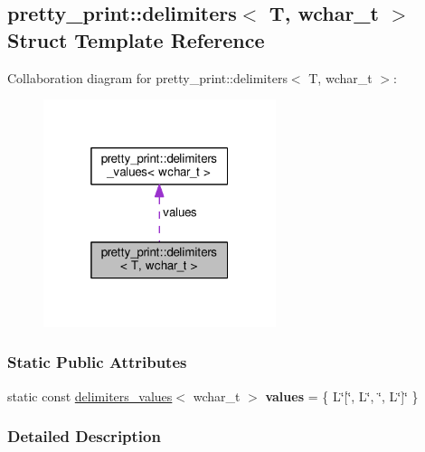 \hypertarget{structpretty__print_1_1delimiters_3_01T_00_01wchar__t_01_4}{}\subsection{pretty\+\_\+print\+:\+:delimiters$<$ T, wchar\+\_\+t $>$ Struct Template Reference}
\label{structpretty__print_1_1delimiters_3_01T_00_01wchar__t_01_4}


Collaboration diagram for pretty\+\_\+print\+:\+:delimiters$<$ T, wchar\+\_\+t $>$\+:
\nopagebreak
\begin{figure}[H]
\begin{center}
\leavevmode
\includegraphics[width=193pt]{structpretty__print_1_1delimiters_3_01T_00_01wchar__t_01_4__coll__graph}
\end{center}
\end{figure}
\subsubsection*{Static Public Attributes}
\begin{DoxyCompactItemize}
\item 
static const \hyperlink{structpretty__print_1_1delimiters__values}{delimiters\+\_\+values}$<$ wchar\+\_\+t $>$ {\bfseries values} = \{ L\char`\"{}\mbox{[}\char`\"{}, L\char`\"{}, \char`\"{}, L\char`\"{}\mbox{]}\char`\"{} \}\hypertarget{structpretty__print_1_1delimiters_3_01T_00_01wchar__t_01_4_a4b83433a6047add4a451e0048b08216c}{}\label{structpretty__print_1_1delimiters_3_01T_00_01wchar__t_01_4_a4b83433a6047add4a451e0048b08216c}

\end{DoxyCompactItemize}


\subsubsection{Detailed Description}
